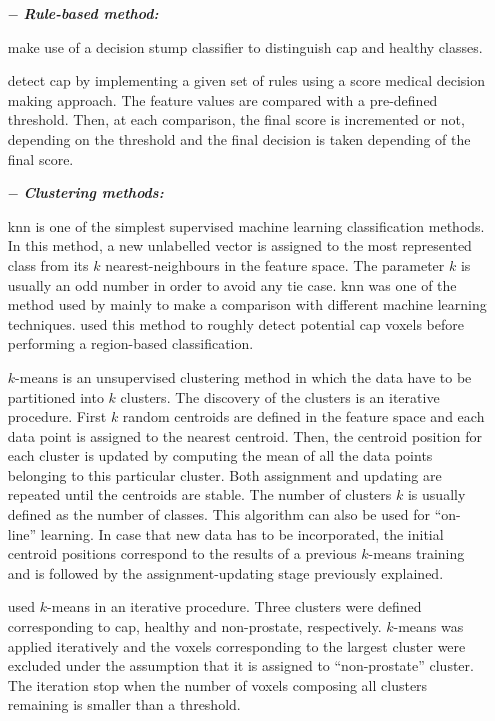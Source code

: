 \begin{enumerate}[leftmargin=*]

\item[$-$] \textbf{\textit{Rule-based method:}}

\cite{Lv2009} make use of a decision stump classifier to distinguish \ac{cap} and healthy classes. 

\cite{Puech2009} detect \ac{cap} by implementing a given set of rules using a score medical decision making approach. The feature values are compared with a pre-defined threshold. Then, at each comparison, the final score is incremented or not, depending on the threshold and the final decision is taken depending of the final score.

\item[$-$] \textbf{\textit{Clustering methods:}} 

\acf{knn} is one of the simplest supervised machine learning classification methods. In this method, a new unlabelled vector is assigned to the most represented class from its $k$ nearest-neighbours in the feature space. The parameter $k$ is usually an odd number in order to avoid any tie case. \ac{knn} was one of the method used by \cite{Niaf2011,Niaf2012} mainly to make a comparison with different machine learning techniques. \cite{Litjens2012} used this method to roughly detect potential \ac{cap} voxels before performing a region-based classification.

$k$-means is an unsupervised clustering method in which the data have to be partitioned into $k$ clusters. The discovery of the clusters is an iterative procedure. First $k$ random centroids are defined in the feature space and each data point is assigned to the nearest centroid. Then, the centroid position for each cluster is updated by computing the mean of all the data points belonging to this particular cluster. Both assignment and updating are repeated until the centroids are stable. The number of clusters $k$ is usually defined as the number of classes. This algorithm can also be used for ``on-line'' learning. In case that new data has to be incorporated, the initial centroid positions correspond to the results of a previous $k$-means training and is followed by the assignment-updating stage previously explained.

\cite{Tiwari2007,Tiwari2009} used $k$-means in an iterative procedure. Three clusters were defined corresponding to \ac{cap}, healthy and non-prostate, respectively. $k$-means was applied iteratively and the voxels corresponding to the largest cluster were excluded under the assumption that it is assigned to ``non-prostate'' cluster. The iteration stop when the number of voxels composing all clusters remaining is smaller than a threshold.


\end{enumerate}

